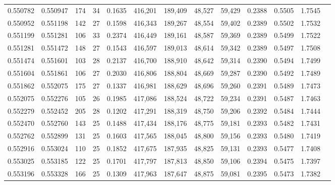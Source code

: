 \begin{tabular}{rrrrrrrrrrrrr}
0.550782 & 0.550947 &   174 &  34 &                                     0.1635 & 416,201 & 189,409 &  48,527 &  59,429 & 0.2388 & 0.5505 & 1.7545 \\
0.550952 & 0.551198 &   142 &  27 &                                     0.1598 & 416,343 & 189,267 &  48,554 &  59,402 & 0.2389 & 0.5502 & 1.7532 \\
0.551199 & 0.551281 &   106 &  33 &                                     0.2374 & 416,449 & 189,161 &  48,587 &  59,369 & 0.2389 & 0.5499 & 1.7522 \\
0.551281 & 0.551472 &   148 &  27 &                                     0.1543 & 416,597 & 189,013 &  48,614 &  59,342 & 0.2389 & 0.5497 & 1.7508 \\
0.551474 & 0.551601 &   103 &  28 &                                     0.2137 & 416,700 & 188,910 &  48,642 &  59,314 & 0.2390 & 0.5494 & 1.7499 \\
0.551604 & 0.551861 &   106 &  27 &                                     0.2030 & 416,806 & 188,804 &  48,669 &  59,287 & 0.2390 & 0.5492 & 1.7489 \\
0.551862 & 0.552075 &   175 &  27 &                                     0.1337 & 416,981 & 188,629 &  48,696 &  59,260 & 0.2391 & 0.5489 & 1.7473 \\
0.552075 & 0.552276 &   105 &  26 &                                     0.1985 & 417,086 & 188,524 &  48,722 &  59,234 & 0.2391 & 0.5487 & 1.7463 \\
0.552279 & 0.552452 &   205 &  28 &                                     0.1202 & 417,291 & 188,319 &  48,750 &  59,206 & 0.2392 & 0.5484 & 1.7444 \\
0.552470 & 0.552760 &   143 &  25 &                                     0.1488 & 417,434 & 188,176 &  48,775 &  59,181 & 0.2393 & 0.5482 & 1.7431 \\
0.552762 & 0.552899 &   131 &  25 &                                     0.1603 & 417,565 & 188,045 &  48,800 &  59,156 & 0.2393 & 0.5480 & 1.7419 \\
0.552916 & 0.553024 &   110 &  25 &                                     0.1852 & 417,675 & 187,935 &  48,825 &  59,131 & 0.2393 & 0.5477 & 1.7408 \\
0.553025 & 0.553185 &   122 &  25 &                                     0.1701 & 417,797 & 187,813 &  48,850 &  59,106 & 0.2394 & 0.5475 & 1.7397 \\
0.553196 & 0.553328 &   166 &  25 &                                     0.1309 & 417,963 & 187,647 &  48,875 &  59,081 & 0.2395 & 0.5473 & 1.7382 \\

\end{tabular}
